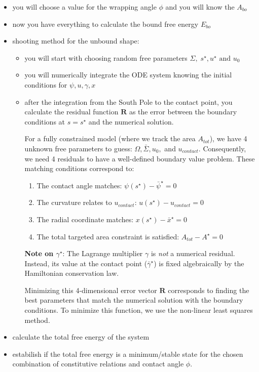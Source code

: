 \documentclass[12pt]{article}
\begin{document}
\begin{itemize}
  \item you will choose a value for the wrapping angle $\phi$ and you will know the $A_{bo}$
  \item now you have everything to calculate the bound free energy $E_{bo}$
  \item shooting method for the unbound shape: 
    \begin{itemize}
      \item you will start with choosing random free parameters $\Sigma,\; s^\star, u^\star \text{ and } u_0$
      \item you will numerically integrate the ODE system knowing the initial conditions for $\psi,u,\gamma,x$
      \item after the integration from the South Pole to the contact point, you calculate the residual function $\mathbf{R}$ as the error between the boundary conditions at $s=s^\star$ and the numerical solution.
      
      For a fully constrained model (where we track the area $A_{tot}$), we have 4 unknown free parameters to guess: $\Omega, \bar{\Sigma}, u_0,$ and $u_{contact}$. Consequently, we need 4 residuals to have a well-defined boundary value problem. These matching conditions correspond to:
      \begin{enumerate}
          \item The contact angle matches: $\psi(s^\star) - \bar{\psi}^\star = 0$
          \item The curvature relates to $u_{contact}$: $u(s^\star) - u_{contact} = 0$
          \item The radial coordinate matches: $x(s^\star) - \bar{x}^\star = 0$
          \item The total targeted area constraint is satisfied: $A_{tot} - A^\star = 0$
      \end{enumerate}
      
      \textbf{Note on $\gamma^\star$}: The Lagrange multiplier $\gamma$ is \textit{not} a numerical residual. Instead, its value at the contact point ($\bar{\gamma}^\star$) is fixed algebraically by the Hamiltonian conservation law.
      
      Minimizing this 4-dimensional error vector $\mathbf{R}$ corresponds to finding the best parameters that match the numerical solution with the boundary conditions. To minimize this function, we use the non-linear least squares method. 
    \end{itemize}
  \item calculate the total free energy of the system
  \item estabilish if the total free energy is a minimum/stable state for the chosen combination of constitutive relations and contact angle $\phi$.
\end{itemize}
\end{document}
